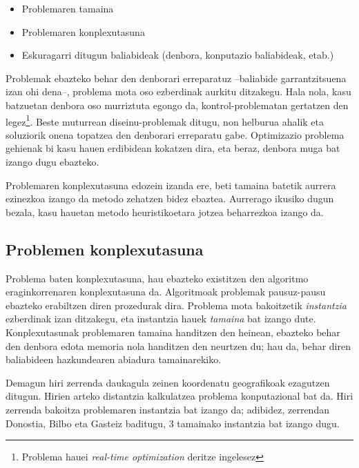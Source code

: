 \documentclass[eu]{ifirak}\usepackage[]{graphicx}\usepackage[]{color}
\begin{document}
\begin{itemize}
\item Problemaren tamaina
\item Problemaren konplexutasuna
\item Eskuragarri ditugun baliabideak (denbora, konputazio baliabideak, etab.)
\end{itemize}

Problemak ebazteko behar den denborari erreparatuz --baliabide garrantzitsuena izan ohi dena--, problema mota oso ezberdinak aurkitu ditzakegu. Hala nola, kasu batzuetan denbora oso murriztuta egongo da, kontrol-problematan gertatzen den legez\footnote{Problema hauei \textit{real-time optimization} deritze ingelesez}. Beste muturrean diseinu-problemak ditugu, non helburua ahalik eta soluziorik onena topatzea den denborari erreparatu gabe. Optimizazio problema gehienak bi kasu hauen erdibidean kokatzen dira, eta beraz, denbora muga bat izango dugu ebazteko. 

Problemaren konplexutasuna edozein izanda ere, beti tamaina batetik aurrera ezinezkoa izango da metodo zehatzen bidez ebaztea. Aurrerago ikusiko dugun bezala, kasu hauetan metodo heuristikoetara jotzea beharrezkoa izango da.

\subsection{Problemen konplexutasuna}
Problema baten konplexutasuna, hau ebazteko existitzen den algoritmo eraginkorrenaren konplexutasuna da. Algoritmoak problemak pausuz-pausu ebazteko erabiltzen diren prozedurak dira. Problema mota bakoitzetik \textit{instantzia} ezberdinak izan ditzakegu, eta instantzia hauek \textit{tamaina} bat izango dute. Konplexutasunak problemaren tamaina handitzen den heinean, ebazteko behar den denbora edota memoria nola handitzen den neurtzen du; hau da, behar diren baliabideen hazkundearen abiadura tamainarekiko.

\begin{tcolorbox}
\begin{ifexample}
Demagun hiri zerrenda daukagula zeinen koordenatu geografikoak ezagutzen ditugun. Hirien arteko distantzia kalkulatzea problema konputazional bat da. Hiri zerrenda bakoitza problemaren instantzia bat izango da; adibidez, zerrendan Donostia, Bilbo eta Gasteiz baditugu, 3 tamainako instantzia bat izango dugu.
\end{ifexample}
\end{tcolorbox}
\end{document}

